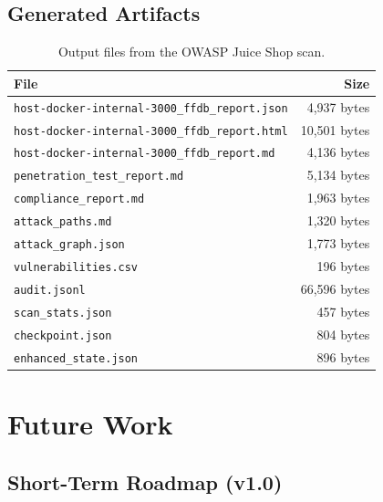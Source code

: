 \documentclass[12pt,a4paper,twoside]{report}
\begin{document}
\section{Generated Artifacts}

\begin{table}[H]
\centering
\caption{Output files from the OWASP Juice Shop scan.}
\label{tab:artifacts}
\begin{tabular}{lr}
\toprule
\textbf{File} & \textbf{Size} \\
\midrule
\texttt{host-docker-internal-3000\_ffdb\_report.json}  & 4,937 bytes \\
\texttt{host-docker-internal-3000\_ffdb\_report.html}  & 10,501 bytes \\
\texttt{host-docker-internal-3000\_ffdb\_report.md}    & 4,136 bytes \\
\texttt{penetration\_test\_report.md}                   & 5,134 bytes \\
\texttt{compliance\_report.md}                          & 1,963 bytes \\
\texttt{attack\_paths.md}                               & 1,320 bytes \\
\texttt{attack\_graph.json}                             & 1,773 bytes \\
\texttt{vulnerabilities.csv}                            & 196 bytes \\
\texttt{audit.jsonl}                                    & 66,596 bytes \\
\texttt{scan\_stats.json}                               & 457 bytes \\
\texttt{checkpoint.json}                                & 804 bytes \\
\texttt{enhanced\_state.json}                           & 896 bytes \\
\bottomrule
\end{tabular}
\end{table}


\chapter{Future Work}
\label{ch:future}

\section{Short-Term Roadmap (v1.0)}
\end{document}
